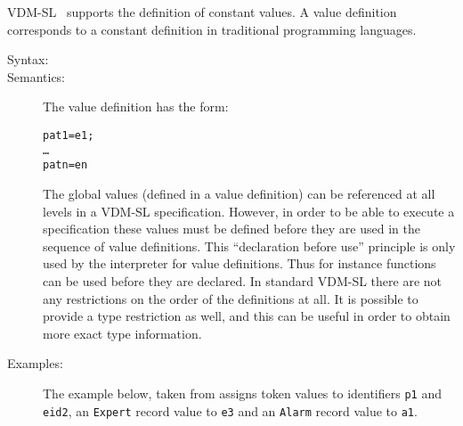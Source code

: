 \documentclass[\pformat,12pt]{article}
\newcommand{\vdmslpp}[2]{%
#1
}
\newcommand{\vdmsl}{VDM-SL}
\newcommand{\vdmpp}{VDM++}
\begin{document}
\vdmslpp{\vdmsl}{\vdmpp}\ supports the definition of constant
values. A value definition corresponds to a constant definition in
traditional programming languages.

\begin{description}
\item[Syntax:]




\item[Semantics:] The value definition has the form:
  \begin{alltt}
       pat1 = e1;
      \ldots
       patn = en
  \end{alltt}

  
  The global values (defined in a value definition) can be referenced
  at all levels in a \vdmslpp{\vdmsl}{\vdmpp} specification.  However,
  in order to be able to execute a specification these 
  values must be defined before they are used in the sequence of value
  definitions. This ``declaration before use'' principle is only used
  by the interpreter for value definitions.
  Thus for instance functions can be used before they are declared. In
  standard VDM-SL there are not any restrictions on the order of the
  definitions at all. It is possible to provide a type restriction as
  well, and this can be useful in order to obtain more exact type
  information.


\item[Examples:] The example below, taken from \cite{Fitzgerald&98}
  assigns token values to identifiers  
  \texttt{p1} and \texttt{eid2}, an \texttt{Expert} record value to 
  \texttt{e3} and an \texttt{Alarm} record value to \texttt{a1}.
\begin{alltt}


\end{alltt}
\end{description}
\end{document}
